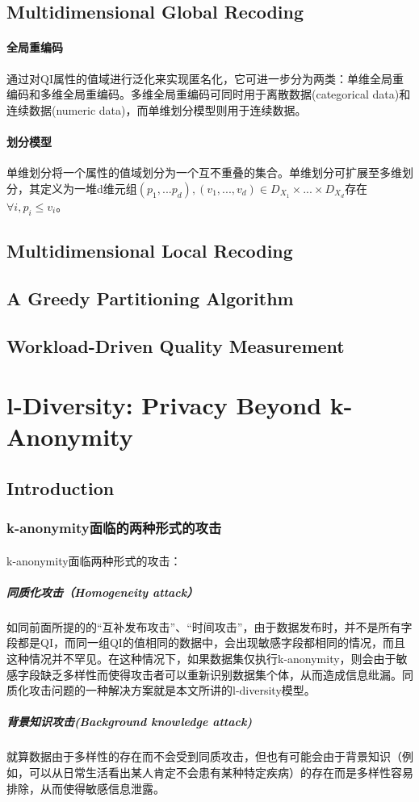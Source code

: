 \documentclass[12pt,a4paper]{article}
\begin{document}
\subsection{Multidimensional Global Recoding}
\paragraph{全局重编码} 通过对QI属性的值域进行泛化来实现匿名化，它可进一步分为两类：单维全局重编码和多维全局重编码。多维全局重编码可同时用于离散数据(categorical data)和连续数据(numeric data)，而单维划分模型则用于连续数据。
\paragraph{划分模型} 单维划分将一个属性的值域划分为一个互不重叠的集合。单维划分可扩展至多维划分，其定义为一堆d维元组$(p_1,...p_d),(v_1,...,v_d) \in D_{X_1} \times ... \times D_{X_d}$存在$ \forall i, p_i \leq v_i$。
\subsection{Multidimensional Local Recoding}

\subsection{A Greedy Partitioning Algorithm}

\subsection{Workload-Driven Quality Measurement}



\section{l-Diversity: Privacy Beyond k-Anonymity\cite{l-diversity} }
\subsection{Introduction}
\subsubsection{k-anonymity面临的两种形式的攻击}
\paragraph{} k-anonymity面临两种形式的攻击：
	\subparagraph{同质化攻击（Homogeneity attack）} 如同前面所提的的“互补发布攻击”、“时间攻击”，由于数据发布时，并不是所有字段都是QI，而同一组QI的值相同的数据中，会出现敏感字段都相同的情况，而且这种情况并不罕见。在这种情况下，如果数据集仅执行k-anonymity，则会由于敏感字段缺乏多样性而使得攻击者可以重新识别数据集个体，从而造成信息纰漏。同质化攻击问题的一种解决方案就是本文所讲的l-diversity模型。
	\subparagraph{背景知识攻击(Background knowledge attack)} 就算数据由于多样性的存在而不会受到同质攻击，但也有可能会由于背景知识（例如，可以从日常生活看出某人肯定不会患有某种特定疾病）的存在而是多样性容易排除，从而使得敏感信息泄露。
	
\end{document}
